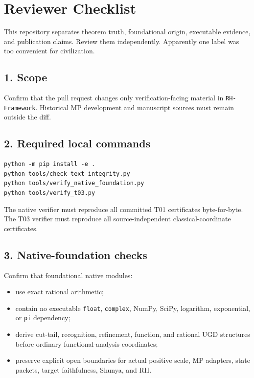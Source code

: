 \hypertarget{reviewer-checklist}{%
\chapter{Reviewer Checklist}\label{reviewer-checklist}}

This repository separates theorem truth, foundational origin, executable evidence, and publication claims. Review them independently. Apparently one label was too convenient for civilization.

\hypertarget{scope}{%
\section{1. Scope}\label{scope}}

Confirm that the pull request changes only verification-facing material in \texttt{RH-Framework}. Historical MP development and manuscript sources must remain outside the diff.

\hypertarget{required-local-commands}{%
\section{2. Required local commands}\label{required-local-commands}}

\begin{verbatim}
python -m pip install -e .
python tools/check_text_integrity.py
python tools/verify_native_foundation.py
python tools/verify_t03.py
\end{verbatim}

The native verifier must reproduce all committed T01 certificates byte-for-byte. The T03 verifier must reproduce all source-independent classical-coordinate certificates.

\hypertarget{native-foundation-checks}{%
\section{3. Native-foundation checks}\label{native-foundation-checks}}

Confirm that foundational native modules:

\begin{itemize}
\tightlist
\item
  use exact rational arithmetic;
\item
  contain no executable \texttt{float}, \texttt{complex}, NumPy, SciPy, logarithm, exponential, or \texttt{pi} dependency;
\item
  derive cut-tail, recognition, refinement, function, and rational UGD structures before ordinary functional-analysis coordinates;
\item
  preserve explicit open boundaries for actual positive scale, MP adapters, state packets, target faithfulness, Shunya, and RH.
\end{itemize}

